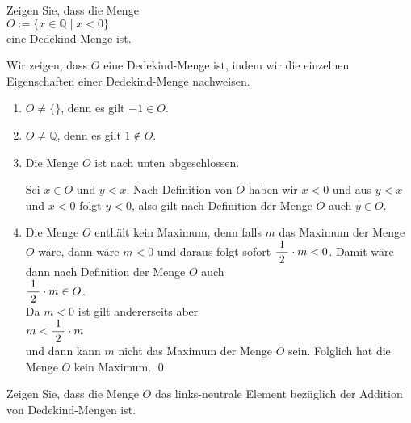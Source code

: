 \exercise
Zeigen Sie, dass die Menge 
\\[0.2cm]
\hspace*{1.3cm}
$O := \{ x \in \mathbb{Q} \mid x < 0 \}$
\\[0.2cm]
eine Dedekind-Menge ist.
\eox

\solution
Wir zeigen, dass $O$ eine Dedekind-Menge ist, indem wir die einzelnen Eigenschaften einer
Dedekind-Menge nachweisen. 
\begin{enumerate}
\item $O \not= \{\}$, denn es gilt $-1 \in O$.
\item $O \not= \mathbb{Q}$, denn es gilt $1 \not\in O$.
\item Die Menge $O$ ist nach unten abgeschlossen.

      Sei $x \in O$ und $y < x$.  Nach Definition von $O$ haben wir
      $x < 0$ und aus $y < x$ und $x < 0$ folgt $y < 0$, also gilt nach Definition der Menge $O$ 
      auch $y \in O$.
\item Die Menge $O$ enthält kein Maximum, denn falls $m$ das Maximum der Menge $O$ wäre,
      dann wäre $m < 0$ und daraus folgt sofort $\displaystyle\frac{\;\displaystyle1\;}{\;\displaystyle2\;} \cdot m < 0$.  Damit wäre dann nach
      Definition der Menge $O$ auch
      \\[0.2cm]
      \hspace*{1.3cm}
      $\displaystyle\frac{\;\displaystyle1\;}{\;\displaystyle2\;} \cdot m \in O$.
      \\[0.2cm]
      Da $m < 0$ ist gilt andererseits aber
      \\[0.2cm]
      \hspace*{1.3cm}
      $m < \displaystyle\frac{\;\displaystyle1\;}{\;\displaystyle2\;} \cdot m$
      \\[0.2cm]
      und dann kann $m$ nicht das Maximum der Menge $O$ sein.   Folglich hat die Menge $O$ kein Maximum.
      \qed
\end{enumerate}
\renewcommand{\labelenumi}{\arabic{enumi}.}
\vspace*{-0.3cm}

\exercise 
Zeigen Sie, dass die Menge $O$ das links-neutrale Element bezüglich der Addition von
Dedekind-Mengen ist.  \eox


